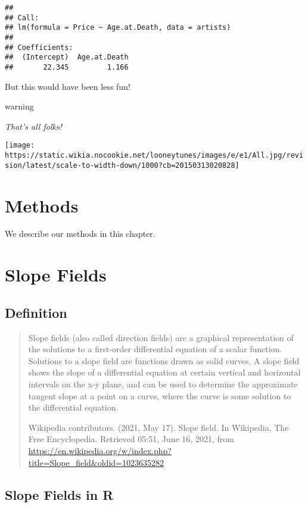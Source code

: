 \documentclass[
]{book}
\begin{document}
\begin{verbatim}
## 
## Call:
## lm(formula = Price ~ Age.at.Death, data = artists)
## 
## Coefficients:
##  (Intercept)  Age.at.Death  
##       22.345         1.166
\end{verbatim}

But this would have been less fun!

\begin{infobox}warning

\emph{That's all folks! }

\texttt{[image: https://static.wikia.nocookie.net/looneytunes/images/e/e1/All.jpg/revision/latest/scale-to-width-down/1000?cb=20150313020828]}

\end{infobox}

\hypertarget{methods}{%
\chapter{Methods}\label{methods}}

We describe our methods in this chapter.

\hypertarget{slope-fields}{%
\chapter{Slope Fields}\label{slope-fields}}

\hypertarget{definition}{%
\section{Definition}\label{definition}}

\begin{quote}
Slope fields (also called direction fields) are a graphical representation of the solutions to a first-order differential equation of a scalar function. Solutions to a slope field are functions drawn as solid curves. A slope field shows the slope of a differential equation at certain vertical and horizontal intervals on the x-y plane, and can be used to determine the approximate tangent slope at a point on a curve, where the curve is some solution to the differential equation.

\hfill Wikipedia contributors. (2021, May 17). Slope field. In Wikipedia, The Free Encyclopedia. Retrieved 05:51, June 16, 2021, from \url{https://en.wikipedia.org/w/index.php?title=Slope_field\&oldid=1023635282}
\end{quote}

\hypertarget{slope-fields-in-r}{%
\section{Slope Fields in R}\label{slope-fields-in-r}}
\end{document}
